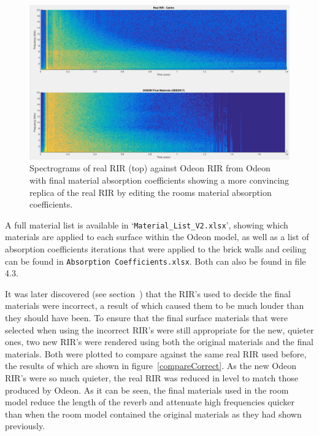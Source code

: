 \documentclass[../../main.tex]{subfiles}
\begin{document}
			\begin{figure}[H]
				\centerline{\includegraphics[scale = 0.4]{Sections/Implementation/Odeon/images/MaterialCompare/OriginalMaterials/new.png}}
				\caption{Spectrograms of real \ac{RIR} (top) against Odeon \ac{RIR} from Odeon with final material absorption coefficients showing a more convincing replica of the real \ac{RIR} by editing the rooms material absorption coefficients.}
				\label{compareNew}
			\end{figure}

			A full material list is available in `\texttt{Material\_List\_V2.xlsx}', showing which materials are applied to each surface within the Odeon model, as well as a list of absorption coefficients iterations that were applied to the brick walls and ceiling can be found in \texttt{Absorption Coefficients.xlsx}. Both can also be found in file 4.3.

			It was later discovered (see section~) that the \ac{RIR}'s used to decide the final materials were incorrect, a result of which caused them to be much louder than they should have been. To ensure that the final surface materials that were selected when using the incorrect \ac{RIR}'s were still appropriate for the new, quieter ones, two new \ac{RIR}'s were rendered using both the original materials and the final materials. Both were plotted to compare against the same real \ac{RIR} used before, the results of which are shown in figure~\ref{compareCorrect}. As the new Odeon \ac{RIR}'s were so much quieter, the real \ac{RIR} was reduced in level to match those produced by Odeon. As it can be seen, the final materials used in the room model reduce the length of the reverb and attenuate high frequencies quicker than when the room model contained the original materials as they had shown previously.  
\end{document}

